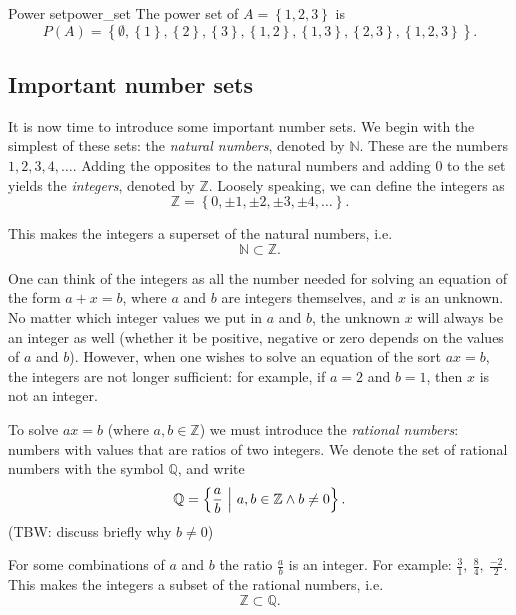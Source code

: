 \begin{example}{Power set}{power_set}
	The power set of $A=\left\{ 1,2,3 \right\}$ is
	\[
		P(A) = \left\{ \emptyset, \left\{ 1 \right\}, \left\{ 2 \right\}, \left\{ 3 \right\}, \left\{ 1,2 \right\}, \left\{ 1,3 \right\}, \left\{ 2,3 \right\}, \left\{ 1,2,3 \right\}\right\}.
	\]
\end{example}

\subsection{Important number sets}
It is now time to introduce some important number sets. We begin with the simplest of these sets: the \emph{natural numbers}, denoted by $\mathbb{N}$. These are the numbers $1,2,3,4,\dots$. Adding the opposites to the natural numbers and adding $0$ to the set yields the \emph{integers}, denoted by $\mathbb{Z}$. Loosely speaking, we can define the integers as
\begin{equation}
	\mathbb{Z}=\left\{ 0,\pm1,\pm2,\pm3,\pm4,\dots \right\}.
	\label{eq:integers}
\end{equation}

This makes the integers a superset of the natural numbers, i.e.
\begin{equation}
	\mathbb{N} \subset \mathbb{Z}.
	\label{eq:naturals_subset_integers}
\end{equation}

One can think of the integers as all the number needed for solving an equation of the form $a+x=b$, where $a$ and $b$ are integers themselves, and $x$ is an unknown. No matter which integer values we put in $a$ and $b$, the unknown $x$ will always be an integer as well (whether it be positive, negative or zero depends on the values of $a$ and $b$). However, when one wishes to solve an equation of the sort $ax=b$, the integers are not longer sufficient: for example, if $a=2$ and $b=1$, then $x$ is not an integer.

To solve $ax=b$ (where $a,b\in\mathbb{Z}$) we must introduce the \emph{rational numbers}: numbers with values that are ratios of two integers. We denote the set of rational numbers with the symbol $\mathbb{Q}$, and write
\begin{equation}
	\mathbb{Q} = \left\{ \frac{a}{b} \ \middle\vert\ a,b\in\mathbb{Z} \wedge b\neq0  \right\}.
	\label{eq:rationals}
\end{equation}
(TBW: discuss briefly why $b\neq0$)

For some combinations of $a$ and $b$ the ratio $\frac{a}{b}$ is an integer. For example: $\frac{3}{1},\ \frac{8}{4},\ \frac{-2}{2}$. This makes the integers a subset of the rational numbers, i.e.
\begin{equation}
	\mathbb{Z}\subset\mathbb{Q}.
	\label{eq:integers_subset_rationals}
\end{equation}


